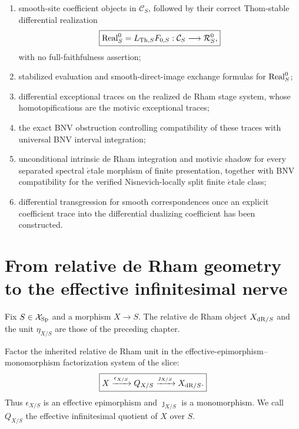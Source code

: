 \begin{enumerate}
Cartesianity, formal-\(\acute{e}\)tale invariance under insertion of an
intermediate base, and local linear completion models;
\item smooth-site coefficient objects in \(\mathcal C_S\), followed by their
correct Thom-stable differential realization
\[
\boxed{
    \operatorname{Real}^{0}_S
    =
    L_{\mathrm{Th},S}F_{0,S}:
    \mathcal C_S\longrightarrow\mathcal R_S^0,
}
\]
with no full-faithfulness assertion;
\item stabilized evaluation and smooth-direct-image exchange formulas for
\(\operatorname{Real}^{0}_S\);
\item differential exceptional traces on the realized de Rham stage system,
whose homotopifications are the motivic exceptional traces;
\item the exact BNV obstruction controlling compatibility of these traces
with universal BNV interval integration;
\item unconditional intrinsic de Rham integration and motivic shadow for every
separated spectral \(\acute{e}\)tale morphism of finite presentation, together
with BNV compatibility for the verified Nisnevich-locally split finite
\(\acute{e}\)tale class;
\item differential transgression for smooth correspondences once an explicit
coefficient trace into the differential dualizing coefficient has been
constructed.
\end{enumerate}

\section{From relative de Rham geometry to the effective infinitesimal nerve}
\label{sec:monadic-de-rham-modality}
\label{sec:modal-infinitesimal-nerve}

Fix \(S\in\mathcal X_{\mathrm{Sp}}\) and a morphism \(X\to S\).  The relative de Rham object
\(X_{\mathrm{dR}/S}\) and the unit \(\eta_{X/S}\) are those of the preceding chapter.

\begin{definition}
\label{def:monadic-de-rham-effective-quotient}
Factor the inherited relative de Rham unit in the effective-epimorphism--monomorphism factorization
system of the slice:
\[
\boxed{
    X\xrightarrow{\epsilon_{X/S}}Q_{X/S}
    \xrightarrow{\jmath_{X/S}}X_{\mathrm{dR}/S}.
}
\]
Thus \(\epsilon_{X/S}\) is an effective epimorphism and \(\jmath_{X/S}\) is a monomorphism.  We call
\(Q_{X/S}\) the effective infinitesimal quotient of \(X\) over \(S\).
\end{definition}


